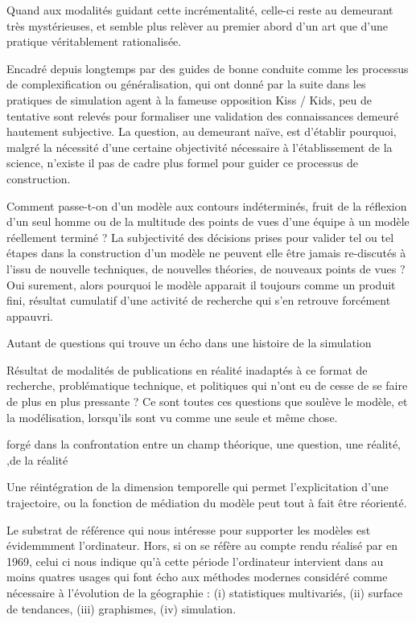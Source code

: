 Quand aux modalités guidant cette incrémentalité, celle-ci reste au demeurant très mystérieuses, et semble plus relèver au premier abord d'un art \autocite{Tocher1963, Axelrod1997} que d'une pratique véritablement rationalisée.

Encadré depuis longtemps par des guides de bonne conduite comme les processus de complexification ou généralisation, qui ont donné par la suite dans les pratiques de simulation agent à la fameuse opposition Kiss / Kids, peu de tentative sont relevés pour formaliser une validation des connaissances demeuré hautement subjective. La question, au demeurant naïve, est d'établir pourquoi, malgré la nécessité d'une certaine objectivité nécessaire à l'établissement de la science, n'existe il pas de cadre plus formel pour guider ce processus de construction.

Comment passe-t-on d'un modèle aux contours indéterminés, fruit de la réflexion d'un seul homme ou de la multitude des points de vues d'une équipe à un modèle réellement terminé ? La subjectivité des décisions prises pour valider tel ou tel étapes dans la construction d'un modèle ne peuvent elle être jamais re-discutés à l'issu de nouvelle techniques, de nouvelles théories, de nouveaux points de vues ? Oui surement, alors pourquoi le modèle apparait il toujours comme un produit fini, résultat cumulatif d'une activité de recherche qui s'en retrouve forcément appauvri. 

Autant de questions qui trouve un écho dans une histoire de la simulation 

Résultat de modalités de publications en réalité inadaptés à ce format de recherche, problématique technique, et politiques qui n'ont eu de cesse de se faire de plus en plus pressante \autocite[9-11]{Axelrod1997} ? Ce sont toutes ces questions que soulève le modèle, et la modélisation, lorsqu'ils sont vu comme une seule et même chose.

forgé dans la confrontation entre un champ théorique, une question, une réalité,   ,de la réalité


Une réintégration de la dimension temporelle qui permet l'explicitation d'une trajectoire, ou la fonction de médiation du modèle peut tout à fait être réorienté.

Le substrat de référence qui nous intéresse pour supporter les modèles est évidemmment l'ordinateur. Hors, si on se réfère au compte rendu réalisé par \textcite{Haggett1969} en 1969, celui ci nous indique qu'à cette période l'ordinateur intervient dans au moins quatres usages qui font écho aux méthodes modernes considéré comme nécessaire \textcite{Claval1977} à l'évolution  de la géographie : (i) statistiques multivariés, (ii) surface de tendances, (iii) graphismes, (iv) simulation. 

